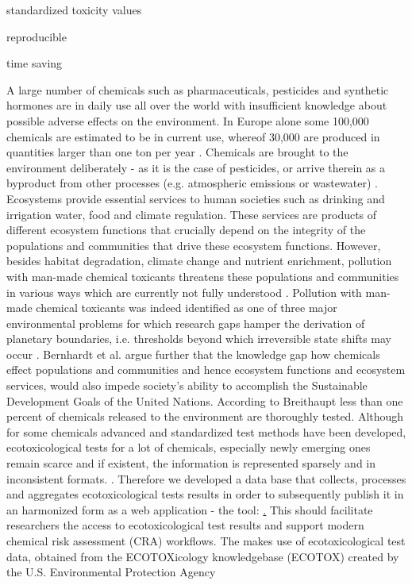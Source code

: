     \item standardized toxicity values
    
    \item reproducible
    
    \item time saving
    


   
\iffalse

A large number of chemicals such as pharmaceuticals, pesticides and synthetic hormones are in daily use all over the world with insufficient knowledge about possible adverse effects on the environment. In Europe alone some 100,000 chemicals are estimated to be in current use, whereof 30,000 are produced in quantities larger than one ton per year \citep{breithaupt_costs_2006}. Chemicals are brought to the environment deliberately - as it is the case of pesticides, or arrive therein as a byproduct from other processes (e.g. atmospheric emissions or wastewater) \citep{schwarzenbach_challenge_2006}. Ecosystems provide essential services to human societies such as drinking and irrigation water, food and climate regulation. These services are products of different ecosystem functions that crucially depend on the integrity of the populations and communities that drive these ecosystem functions. However, besides habitat degradation, climate change and nutrient enrichment, pollution with man-made chemical toxicants threatens these populations and communities in various ways which are currently not fully understood \citep{steffen_anthropocene_2007}. Pollution with man-made chemical toxicants was indeed identified as one of three major environmental problems for which research gaps hamper the derivation of planetary boundaries, i.e. thresholds beyond which irreversible state shifts may occur \citep{steffen_anthropocene_2007}. Bernhardt et al. \citet{bernhardt_synthetic_2017} argue further that the knowledge gap how chemicals effect populations and communities and hence ecosystem functions and ecosystem services, would also impede society's ability to accomplish the Sustainable Development Goals of the United Nations. According to Breithaupt \citet{breithaupt_costs_2006} less than one percent of chemicals released to the environment are thoroughly tested. Although for some chemicals advanced and standardized \citep{oecd_oecd_2018} test methods have been developed, ecotoxicological tests for a lot of chemicals, especially newly emerging ones remain scarce and if existent, the information is represented sparsely and in inconsistent formats. \citep{gessner_fostering_2016}. Therefore we developed a data base that collects, processes and aggregates ecotoxicological tests results in order to subsequently publish it in an harmonized form as a web application - the \etoxbase{} tool: \href{http://139.14.20.252:3838/etox-base-shiny/}. This should facilitate researchers the access to ecotoxicological test results and support modern chemical risk assessment (CRA) workflows. The \etoxbase{} makes use of ecotoxicological test data, obtained from the ECOTOXicology knowledgebase (ECOTOX) created by the U.S. Environmental Protection Agency 